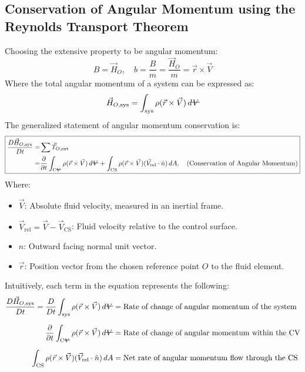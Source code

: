 ﻿\documentclass[12pt]{article}
\newcommand{\vol}{\mathord{\text{\ooalign{\hidewidth $V$\hidewidth\cr\kern-0.5pt\raisebox{0.8ex}{\rule[0pt]{1em}{0.5pt}}}}}}
\begin{document}
\subsection*{Conservation of Angular Momentum using the Reynolds Transport Theorem}
Choosing the extensive property to be angular momentum:
\[B=\vec{H}_O,\quad b=\frac{B}{m}=\frac{\vec{H}_O}{m} = \vec{r}\times\vec{V}\]
Where the total angular momentum of a system can be expressed as:
\[\vec{H}_{O,\text{sys}} = \int_{\text{sys}} \rho (\vec{r}\times\vec{V}) \, d\vol\]
The generalized statement of angular momentum conservation is:
\[
\boxed{
\begin{aligned}
\frac{D\vec H_{O,\mathrm{sys}}}{Dt}=& \sum \vec{T}_{O,\mathrm{ext}}\\
 =&
\frac{\partial}{\partial t}\int_{\mathrm{C}\vol}\rho(\vec r\times\vec V)\,d\vol+\int_{\mathrm{CS}}\rho(\vec r\times\vec V)(\vec{V}_\text{rel}\cdot\hat n)\,dA,\quad \text{(Conservation of Angular Momentum)}
\end{aligned}
}
\]
Where:
\begin{itemize}
    \item $\vec{V}$: Absolute fluid velocity, measured in an inertial frame.
    \item $\vec{V}_{\mathrm{rel}} = \vec{V} - \vec{V}_{\mathrm{CS}}$: Fluid velocity relative to the control surface.
    \item $\hat{n}$: Outward facing normal unit vector.
    \item $\vec{r}$: Position vector from the chosen reference point $O$ to the fluid element.
\end{itemize}
Intuitively, each term in the equation represents the following:
\[
\begin{aligned}
\frac{D\vec{H}_{O,\mathrm{sys}}}{Dt}
= \frac{D}{Dt}\int_{\mathrm{sys}}\rho(\vec r\times\vec V)\,d\vol
&= \text{Rate of change of angular momentum of the system}\\[6pt]
\frac{\partial}{\partial t}\int_{\mathrm{C}\vol}\rho(\vec r\times\vec V)\,d\vol
&= \text{Rate of change of angular momentum within the CV}\\[6pt]
\int_{\mathrm{CS}}\rho(\vec r\times\vec V)(\vec V_{\mathrm{rel}}\cdot\hat n)\,dA
&= \text{Net rate of angular momentum flow through the CS}
\end{aligned}
\]
\end{document}

